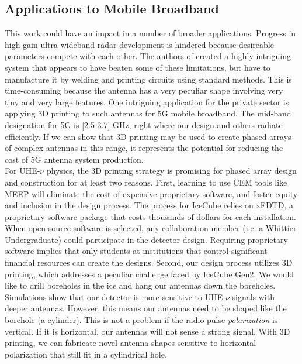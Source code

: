 \documentclass[../../../main.tex]{subfiles}
\begin{document}
\subsection{Applications to Mobile Broadband}
\label{sec:applications}

This work could have an impact in a number of broader applications.  Progress in high-gain ultra-wideband radar development is hindered because desireable parameters compete with each other.  The authors of \cite{10.3390/electronics10121377} created a highly intriguing system that appears to have beaten some of these limitations, but have to manufacture it by welding and printing circuits using standard methods.  This is time-consuming because the antenna has a very peculiar shape involving very tiny and very large features.  One intriguing application for the private sector is applying 3D printing to such antennas for 5G mobile broadband.  The mid-band designation for 5G is [2.5-3.7] GHz, right where our design and others radiate efficiently.  If we can show that 3D printing may be used to create phased arrays of complex antennas in this range, it represents the potential for reducing the cost of 5G antenna system production.
\\
\vspace{0.25cm}
For UHE-$\nu$ physics, the 3D printing strategy is promising for phased array design and construction for at least two reasons.  First, learning to use CEM tools like MEEP will eliminate the cost of expensive proprietary software, and foster equity and inclusion in the design process.  The process for IceCube relies on xFDTD, a proprietary software package that costs thousands of dollars for each installation.  When open-source software is selected, any collaboration member (i.e. a Whittier Undergraduate) could participate in the detector design.  Requiring proprietary software implies that only students at institutions that control significant financial resources can create the designs.  Second, our design process utilizes 3D printing, which addresses a peculiar challenge faced by IceCube Gen2.  We would like to drill boreholes in the ice and hang our antennas down the boreholes.  Simulations show that our detector is more sensitive to UHE-$\nu$ signals with deeper antennas.  However, this means our antennas need to be shaped like the borehole (a cylinder).  This is not a problem if the radio pulse \textit{polarization} is vertical.  If it is horizontal, our antennas will not sense a strong signal.  With 3D printing, we can fabricate novel antenna shapes sensitive to horizontal polarization that still fit in a cylindrical hole.
\end{document}

